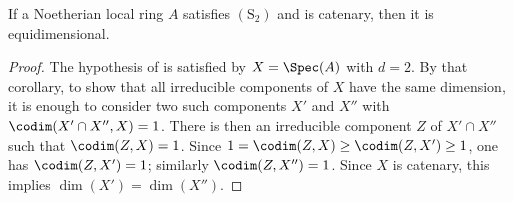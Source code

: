 \begin{corollary}[5.10.9]
\label{IV.5.10.9}
If a Noetherian local ring $A$ satisfies $(\mathrm S_2)$ and is
catenary, then it is equidimensional.
\end{corollary}

\begin{proof}
The hypothesis of  is satisfied by
$X=\Spec(A)$ with $d=2$.  By that corollary, to show that all
irreducible components of $X$ have the same dimension, it is
enough to consider two such components $X'$ and $X''$ with $\codim(X'\cap X'',X)=1$.
There is then an irreducible component $Z$ of $X'\cap X''$ such
that $\codim(Z,X)=1$.  Since $1=\codim(Z,X)\geq\codim(Z,X')\geq1$,
one has $\codim(Z,X')=1$; similarly
$\codim(Z,X'')=1$.  Since $X$ is catenary, this implies
$\dim(X')=\dim(X'')$.
\end{proof}

